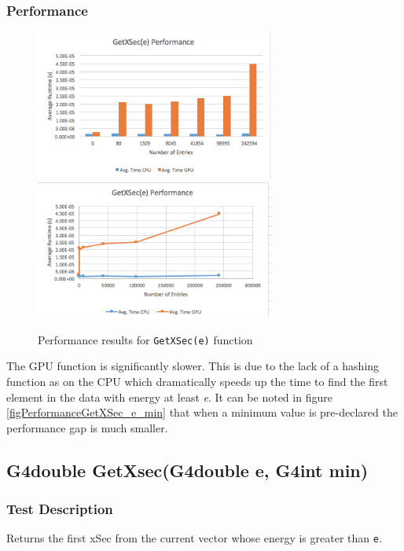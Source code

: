 \documentclass[12pt]{article}
\begin{document}
	\subsubsection{Performance}
    	\begin{figure}[H]
    	\centering
    	\caption{Performance results for \texttt{GetXSec(e)} function}\label{figPerformanceGetXSec_e}
    	\includegraphics[width=0.7\textwidth]{getxsec_e_bar.png}
    	\includegraphics[width=0.7\textwidth]{getxsec_e_line.png}
    	\end{figure}
	The GPU function is significantly slower. This is due to the lack of a hashing function as on the CPU which dramatically speeds up the time to find the first element in the data with energy at least \emph{e}. It can be noted in figure \ref{figPerformanceGetXSec_e_min} that when a minimum value is pre-declared the performance gap is much smaller.
	
\subsection{G4double GetXsec(G4double e, G4int min)}
	\subsubsection{Test Description}
	Returns the first xSec from the current vector whose energy is greater than \texttt{e}. 
	
\end{document}
